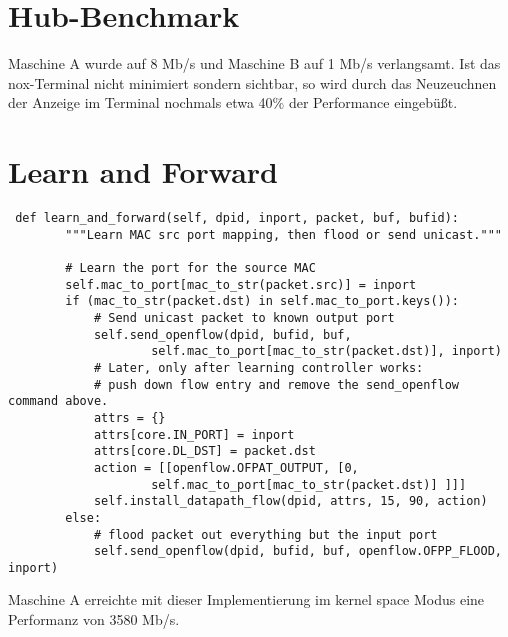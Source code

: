 \documentclass[a4paper,10pt]{scrartcl}
\begin{document}
\section*{Hub-Benchmark}
  Maschine A wurde auf 8 Mb/s und Maschine B auf 1 Mb/s verlangsamt. Ist das nox-Terminal nicht minimiert sondern sichtbar, so wird durch das Neuzeuchnen der Anzeige im Terminal nochmals etwa 40\% der Performance eingebüßt. 
\section*{Learn and Forward}
\begin{verbatim}
 def learn_and_forward(self, dpid, inport, packet, buf, bufid):
        """Learn MAC src port mapping, then flood or send unicast."""

        # Learn the port for the source MAC
        self.mac_to_port[mac_to_str(packet.src)] = inport
        if (mac_to_str(packet.dst) in self.mac_to_port.keys()):
            # Send unicast packet to known output port
            self.send_openflow(dpid, bufid, buf, 
                    self.mac_to_port[mac_to_str(packet.dst)], inport)
            # Later, only after learning controller works: 
            # push down flow entry and remove the send_openflow command above.
            attrs = {}
            attrs[core.IN_PORT] = inport
            attrs[core.DL_DST] = packet.dst
            action = [[openflow.OFPAT_OUTPUT, [0, 
                    self.mac_to_port[mac_to_str(packet.dst)] ]]]
            self.install_datapath_flow(dpid, attrs, 15, 90, action)
        else:
            # flood packet out everything but the input port
            self.send_openflow(dpid, bufid, buf, openflow.OFPP_FLOOD, inport)
\end{verbatim}
Maschine A erreichte mit dieser Implementierung im kernel space Modus eine Performanz von 3580 Mb/s.
\end{document}
